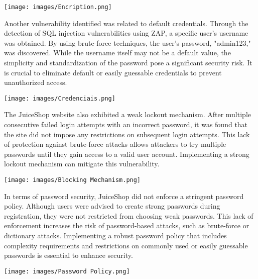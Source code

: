 \documentclass[12pt]{article}
\begin{document}
\begin{center}
    \texttt{[image: images/Encription.png]}
\end{center}

\newpage

Another vulnerability identified was related to default credentials. Through the detection of SQL injection vulnerabilities using ZAP, a specific user's username was obtained. By using brute-force techniques, the user's password, "admin123," was discovered. While the username itself may not be a default value, the simplicity and standardization of the password pose a significant security risk. It is crucial to eliminate default or easily guessable credentials to prevent unauthorized access.


\begin{center}
    \texttt{[image: images/Credenciais.png]}
\end{center}

The JuiceShop website also exhibited a weak lockout mechanism. After multiple consecutive failed login attempts with an incorrect password, it was found that the site did not impose any restrictions on subsequent login attempts. This lack of protection against brute-force attacks allows attackers to try multiple passwords until they gain access to a valid user account. Implementing a strong lockout mechanism can mitigate this vulnerability.

\begin{center}
    \texttt{[image: images/Blocking Mechanism.png]}
\end{center}

\newpage

In terms of password security, JuiceShop did not enforce a stringent password policy. Although users were advised to create strong passwords during registration, they were not restricted from choosing weak passwords. This lack of enforcement increases the risk of password-based attacks, such as brute-force or dictionary attacks. Implementing a robust password policy that includes complexity requirements and restrictions on commonly used or easily guessable passwords is essential to enhance security.

\begin{center}
    \texttt{[image: images/Password Policy.png]}
\end{center}
\end{document}
